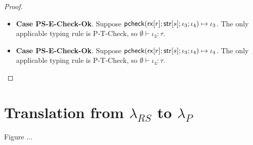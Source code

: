 \documentclass[11pt,leqno]{article}
\theoremstyle{definition}
\newcommand{\lambdas}{\lambda_{RS}}
\newcommand{\lambdap}{\lambda_P}
\newcommand{\tcheck}[4]{{\sf pcheck}(#1; #2; #3; #4)}
\renewcommand{\tstr}[1]{{{\sf str}[#1]}}
\newcommand{\rx}[1]{ {\sf rx}[#1] }
\begin{document}
\begin{proof}
\begin{itemize}[label=$ $,itemsep=1ex]
\item \textbf{Case PS-E-Check-Ok}.
Suppose $\tcheck{\rx{r}}{\tstr{s}}{\iota_3}{\iota_4} \mapsto \iota_3$. 
The only applicable typing rule is P-T-Check, so $\emptyset \vdash \iota_3 : \tau$.

\item \textbf{Case PS-E-Check-Ok}.
Suppose $\tcheck{\rx{r}}{\tstr{s}}{\iota_3}{\iota_4} \mapsto \iota_4$. 
The only applicable typing rule is P-T-Check, so $\emptyset \vdash \iota_4 : \tau$.

\end{itemize}



\end{proof}



\section{Translation from $\lambdas$ to $\lambdap$}
Figure ...
\end{document}

